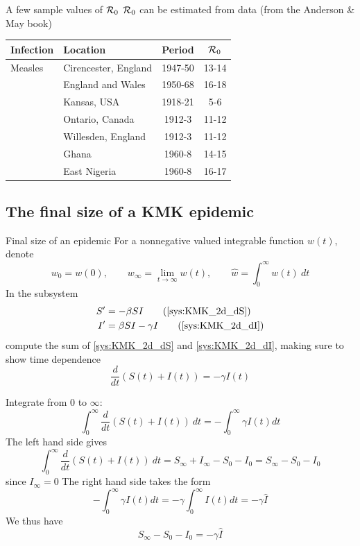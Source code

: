 \documentclass[aspectratio=169]{beamer}\usepackage[]{graphicx}\usepackage[]{xcolor}
\begin{document}
\begin{frame}{A few sample values of $\mathcal{R}_0$}
  $\mathcal{R}_0$ can be estimated from data (from the Anderson \& May book)
  \vfill
  \begin{center}
  \begin{tabular}{llcc}
  \hline 
  Infection & Location & Period & $\mathcal{R}_0$ \\
  \hline
  Measles & Cirencester, England & 1947-50 & 13-14 \\
  & England and Wales & 1950-68 & 16-18 \\
  & Kansas, USA & 1918-21 & 5-6 \\
  & Ontario, Canada & 1912-3 & 11-12 \\
  & Willesden, England & 1912-3 & 11-12 \\
  & Ghana & 1960-8 & 14-15 \\
  & East Nigeria & 1960-8 & 16-17 \\
  \end{tabular}
  \end{center}
\end{frame}
    

\subsection{The final size of a KMK epidemic}

\begin{frame}{Final size of an epidemic}
  For a nonnegative valued integrable function $w(t)$, denote
  $$
  w_0=w(0),\qquad  w_\infty = \lim_{t\to\infty}w(t),\qquad\hat w = \int_0^\infty w(t)\ dt
  $$
  \vfill
  In the subsystem
  \begin{align}
  S' &= -\beta SI \tag{\ref{sys:KMK_2d_dS}} \\
  I' &= \beta SI-\gamma I \tag{\ref{sys:KMK_2d_dI}} 
  \end{align}
  compute the sum of \eqref{sys:KMK_2d_dS} and \eqref{sys:KMK_2d_dI}, making sure to show time dependence $$
  \frac{d}{dt}(S(t)+I(t))=-\gamma I(t)
  $$
\end{frame}


\begin{frame}{}
  Integrate from 0 to $\infty$:
  $$
  \int_0^\infty\frac{d}{dt}(S(t)+I(t))\ dt=-\int_0^\infty\gamma I(t)dt 
  $$
  The left hand side gives
  $$
  \int_0^\infty\frac{d}{dt}(S(t)+I(t))\ dt
  = S_\infty+I_\infty-S_0-I_0 = S_\infty-S_0-I_0
  $$
  since $I_\infty=0$
  \vfill
  The right hand side takes the form
  $$
  -\int_0^\infty\gamma I(t)dt = -\gamma\int_0^\infty I(t)dt = -\gamma \hat I
  $$
  We thus have
  \begin{equation}
  \label{eq:KMK_final_size_step1}
  S_\infty-S_0-I_0 = -\gamma\hat I
  \end{equation}
\end{frame}
\end{document}
